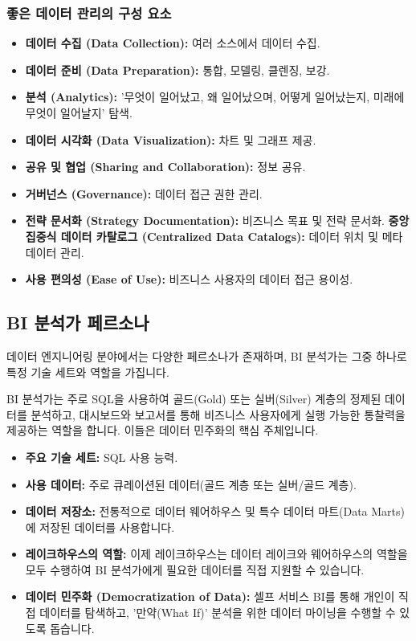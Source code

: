 \documentclass[11pt,a4paper]{article}
\theoremstyle{definition}
\begin{document}
\subsubsection{좋은 데이터 관리의 구성 요소}
\begin{itemize}
    \item \textbf{데이터 수집 (Data Collection):} 여러 소스에서 데이터 수집.
    \item \textbf{데이터 준비 (Data Preparation):} 통합, 모델링, 클렌징, 보강.
    \item \textbf{분석 (Analytics):} '무엇이 일어났고, 왜 일어났으며, 어떻게 일어났는지, 미래에 무엇이 일어날지' 탐색.
    \item \textbf{데이터 시각화 (Data Visualization):} 차트 및 그래프 제공.
    \item \textbf{공유 및 협업 (Sharing and Collaboration):} 정보 공유.
    \item \textbf{거버넌스 (Governance):} 데이터 접근 권한 관리.
    \item \textbf{전략 문서화 (Strategy Documentation):} 비즈니스 목표 및 전략 문서화.
    \textbf{중앙 집중식 데이터 카탈로그 (Centralized Data Catalogs):} 데이터 위치 및 메타데이터 관리.
    \item \textbf{사용 편의성 (Ease of Use):} 비즈니스 사용자의 데이터 접근 용이성.
\end{itemize}

\subsection{BI 분석가 페르소나}
데이터 엔지니어링 분야에서는 다양한 페르소나가 존재하며, BI 분석가는 그중 하나로 특정 기술 세트와 역할을 가집니다.

\begin{summarybox}[title=핵심 요약: 비즈니스 통찰력의 전달자]
BI 분석가는 주로 SQL을 사용하여 골드(Gold) 또는 실버(Silver) 계층의 정제된 데이터를 분석하고, 대시보드와 보고서를 통해 비즈니스 사용자에게 실행 가능한 통찰력을 제공하는 역할을 합니다. 이들은 데이터 민주화의 핵심 주체입니다.
\end{summarybox}

\begin{itemize}
    \item \textbf{주요 기술 세트:} SQL 사용 능력.
    \item \textbf{사용 데이터:} 주로 큐레이션된 데이터(골드 계층 또는 실버/골드 계층).
    \item \textbf{데이터 저장소:} 전통적으로 데이터 웨어하우스 및 특수 데이터 마트(Data Marts)에 저장된 데이터를 사용합니다.
    \item \textbf{레이크하우스의 역할:} 이제 레이크하우스는 데이터 레이크와 웨어하우스의 역할을 모두 수행하여 BI 분석가에게 필요한 데이터를 직접 지원할 수 있습니다.
    \item \textbf{데이터 민주화 (Democratization of Data):} 셀프 서비스 BI를 통해 개인이 직접 데이터를 탐색하고, '만약(What If)' 분석을 위한 데이터 마이닝을 수행할 수 있도록 돕습니다.
\end{itemize}
\end{document}
